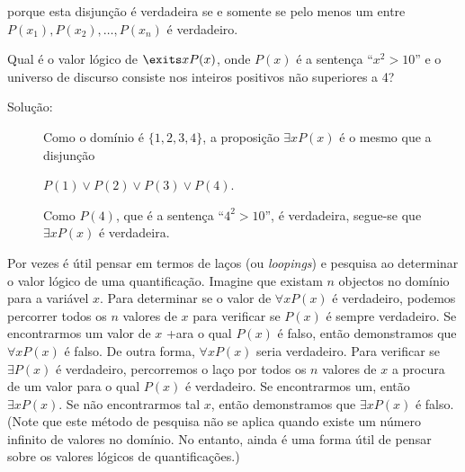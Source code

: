 porque esta disjunção é verdadeira se e somente se pelo menos um entre $P(x_1),
P(x_2), \ldots, P(x_n)$ é verdadeiro.

\begin{exmp}
\label{exem140}
Qual é o valor lógico de $\exits xP(x)$, onde $P(x)$ é a sentença ``$x^2 > 10$''
e o universo de discurso consiste nos inteiros positivos não superiores a 4?
\begin{description}
\item[Solução:]Como o domínio é $\{1,2,3,4\}$, a proposição $\exists xP(x)$ é o
mesmo que a disjunção

\begin{center}
$P(1) \lor P(2) \lor P(3) \lor P(4)$.
\end{center}

Como $P(4)$, que é a sentença ``$4^2 > 10$'', é verdadeira, segue-se que
$\exists xP(x)$ é verdadeira.
\end{description}
\end{exmp}

Por vezes é útil pensar em termos de laços (ou \emph{loopings}) e pesquisa ao
determinar o valor lógico de uma quantificação. Imagine que existam $n$
objectos no domínio para a variável $x$. Para determinar se o valor de $\forall
xP(x)$ é verdadeiro, podemos percorrer todos os $n$ valores de $x$ para
verificar se $P(x)$ é sempre verdadeiro. Se encontrarmos um valor de $x$ +ara o
qual $P(x)$ é falso, então demonstramos que $\forall xP(x)$ é falso. De outra
forma, $\forall xP(x)$ seria verdadeiro. Para verificar se $\exists P(x)$ é
verdadeiro, percorremos o laço por todos os $n$ valores de $x$ a procura de um
valor para o qual $P(x)$ é verdadeiro. Se encontrarmos um, então $\exists
xP(x)$. Se não encontrarmos tal $x$, então demonstramos que $\exists xP(x)$ é
falso. (Note que este método de pesquisa não se aplica quando existe um número
infinito de valores no domínio. No entanto, ainda é uma forma útil de pensar
sobre os valores lógicos de quantificações.)

